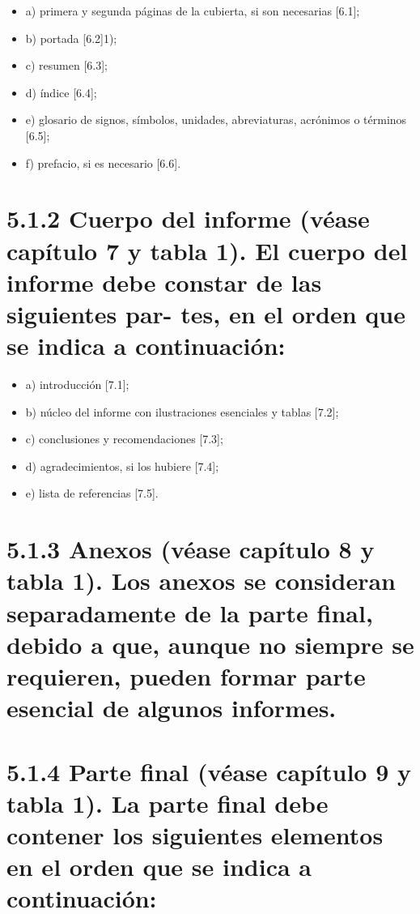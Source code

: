 \begin{Form}
\begin{itemize}

    \item a) primera y segunda páginas de la cubierta, si son necesarias [6.1];
    \item b) portada [6.2]1);
    \item c) resumen [6.3];
    \item d) índice [6.4];
    \item e) glosario de signos, símbolos, unidades, abreviaturas, acrónimos o términos [6.5];
    \item f) prefacio, si es necesario [6.6].
\end{itemize}

\section{5.1.2 Cuerpo del informe (véase capítulo 7 y tabla 1). El cuerpo del informe debe constar de las siguientes par-
tes, en el orden que se indica a continuación:}

\begin{itemize}

    \item a) introducción [7.1];
    \item b) núcleo del informe con ilustraciones esenciales y tablas [7.2];
    \item c) conclusiones y recomendaciones [7.3];
    \item d) agradecimientos, si los hubiere [7.4];
    \item e) lista de referencias [7.5].
\end{itemize}
\section{5.1.3 Anexos (véase capítulo 8 y tabla 1). Los anexos se consideran separadamente de la parte final, debido a que,
aunque no siempre se requieren, pueden formar parte esencial de algunos informes.
}


\section{5.1.4 Parte final (véase capítulo 9 y tabla 1). La parte final debe contener los siguientes elementos en el orden
que se indica a continuación:}

\begin{itemize}


\end{itemize}
\end{Form}
